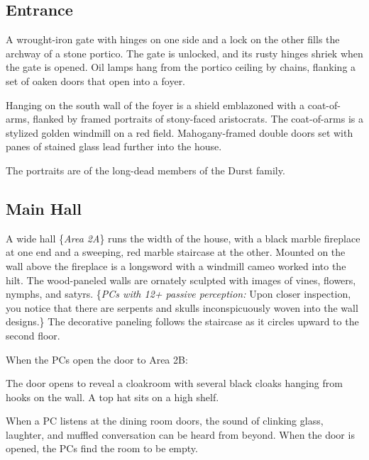 \subsection{Entrance}
\label{sec:Entrance}
\begin{readout}
  A wrought-iron gate with hinges on one side and a lock on the other fills the archway of a stone portico.
  The gate is unlocked, and its rusty hinges shriek when the gate is opened. Oil lamps hang from the portico
  ceiling by chains, flanking a set of oaken doors that open into a foyer.
  
  Hanging on the south wall of the foyer is a shield emblazoned with a coat-of-arms, flanked by framed portraits 
  of stony-faced aristocrats. The coat-of-arms is a stylized golden windmill on a red field. Mahogany-framed 
  double doors set with panes of stained glass lead further into the house.
\end{readout}
The portraits are of the long-dead members of the Durst family.
\begin{arealinks}
\end{arealinks}


\pagebreak
\subsection{Main Hall}
\label{sec:MainHall}
\begin{readout}
  A wide hall \{\textit{Area 2A}\} runs the width of the house, with a black marble fireplace at one end and
  a sweeping, red marble staircase at the other. Mounted on the wall above the fireplace is a longsword with a
  windmill cameo worked into the hilt. The wood-paneled walls are ornately sculpted with images of vines,
  flowers, nymphs, and satyrs. \{\textit{PCs with 12+ passive perception:} Upon closer inspection, you notice
  that there are serpents and skulls inconspicuously woven into the wall designs.\} The decorative paneling
  follows the staircase as it circles upward to the second floor.
\end{readout}
When the PCs open the door to Area 2B:
\begin{readout}
  The door opens to reveal a cloakroom with several black cloaks hanging from hooks on the wall. A top hat
  sits on a high shelf.
\end{readout}
When a PC listens at the dining room doors, the sound of clinking glass, laughter, and muffled conversation can be heard from beyond. When the door is opened, the PCs find the room to be empty.

